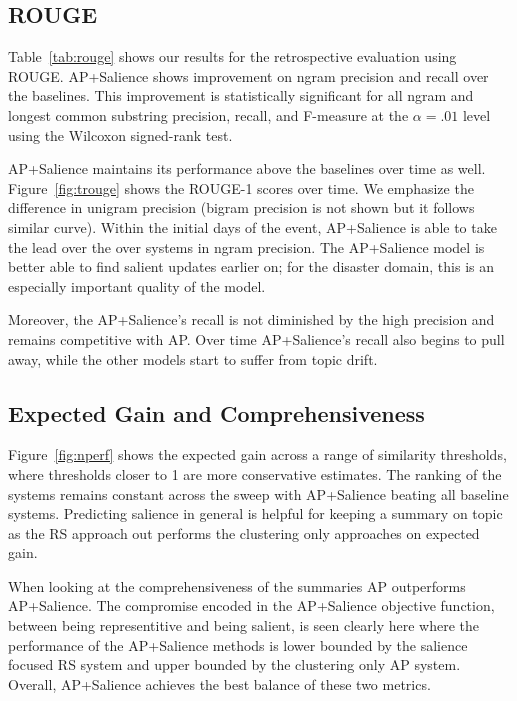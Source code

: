 
\subsection{ROUGE}


Table~\ref{tab:rouge} shows our results for the retrospective evaluation using ROUGE. 
AP+Salience shows improvement on ngram precision and recall over the 
baselines. This improvement is statistically significant for all ngram and longest common substring
precision, recall, and F-measure
at the $\alpha = .01$ level
using the Wilcoxon signed-rank test. 

AP+Salience maintains its performance above the baselines over time as well. Figure~\ref{fig:trouge}
shows the ROUGE-1 scores over time. 
We emphasize the difference in unigram precision (bigram precision is not shown but it follows
similar curve).
Within the initial days of the event, AP+Salience is able to take the lead over the over 
systems in ngram precision. 
The AP+Salience model is better able to find salient updates
earlier on; for the disaster domain, this is an especially important quality of the model. 

Moreover, the AP+Salience's recall is not diminished by the high precision and remains competitive with AP.
Over time AP+Salience's recall also begins to pull away, while the other models start to suffer
from topic drift.


\subsection{Expected Gain and Comprehensiveness}

Figure~\ref{fig:nperf} shows the expected gain across a range of 
similarity thresholds, where thresholds closer to 1 are more conservative
estimates. The ranking of the systems remains constant across the 
sweep with 
AP+Salience beating all baseline systems.
Predicting salience in general is helpful for keeping a summary on topic as
the RS approach out performs the clustering only approaches
on expected gain.

When looking at the comprehensiveness of the summaries AP outperforms
 AP+Salience. The compromise encoded in the AP+Salience objective
function, between being representitive and being salient, is seen clearly here
where the performance of the AP+Salience methods is lower bounded by 
the salience focused RS
system and upper bounded by the clustering only AP system.
Overall, AP+Salience achieves the best balance of these two metrics.



